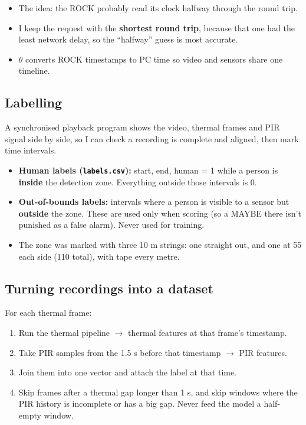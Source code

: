 \documentclass[11pt,a4paper]{article}
\providecommand{\tightlist}{\setlength{\itemsep}{0pt}\setlength{\parskip}{0pt}}
\begin{document}
\begin{itemize}
\tightlist
\item
  The idea: the ROCK probably
  read its clock halfway
  through the round trip.
\item
  I keep the request with the
  \textbf{shortest round
  trip}, because that one had
  the least network delay, so
  the ``halfway'' guess is
  most accurate.
\item
  $\theta$ converts ROCK timestamps
  to PC time so video and
  sensors share one timeline.
\end{itemize}

\hypertarget{labelling}{%
\subsection{Labelling}\label{labelling}}

A synchronised playback
program shows the video,
thermal frames and PIR signal
side by side, so I can check a
recording is complete and
aligned, then mark time
intervals.

\begin{itemize}
\tightlist
\item
  \textbf{Human labels
  (\texttt{labels.csv}):}
  start, end, human = 1 while
  a person is \textbf{inside}
  the detection zone.
  Everything outside those
  intervals is 0.
\item
  \textbf{Out-of-bounds
  labels:} intervals where a
  person is visible to a
  sensor but \textbf{outside}
  the zone. These are used
  only when scoring (so a
  MAYBE there isn't punished
  as a false alarm). Never
  used for training.
\item
  The zone was marked with
  three 10 m strings: one
  straight out, and one at 55\textdegree{}
  each side (110\textdegree{} total), with
  tape every metre.
\end{itemize}

\hypertarget{turning-recordings-into-a-dataset}{%
\subsection{Turning recordings
into a
dataset}\label{turning-recordings-into-a-dataset}}

For each thermal frame:

\begin{enumerate}
\def\labelenumi{\arabic{enumi}.}
\tightlist
\item
  Run the thermal pipeline $\rightarrow$
  thermal features at that
  frame's timestamp.
\item
  Take PIR samples from the
  1.5 s before that timestamp
  $\rightarrow$ PIR features.
\item
  Join them into one vector
  and attach the label at that
  time.
\item
  Skip frames after a thermal
  gap longer than 1 s, and
  skip windows where the PIR
  history is incomplete or has
  a big gap. Never feed the
  model a half-empty window.
\end{enumerate}
\end{document}
